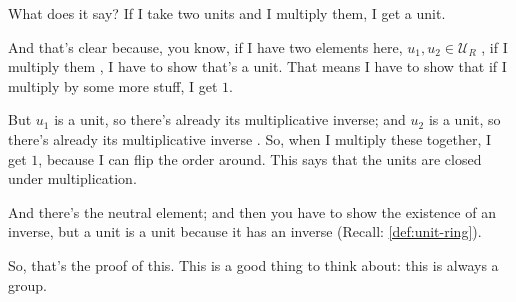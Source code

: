 \begin{speech}[00:29:52 - 00:30:47]
What does it say? If I take two units and I multiply them, I get a unit.

And that's clear because, you know, if I have two elements here, $u_1, u_2 \in \mathcal{U}_R$ , if I multiply them , I have to show that's a unit. That means I have to show that if I multiply by some more stuff, I get $1$.

But $u_1$ is a unit, so there's already its multiplicative inverse; and $u_2$ is a unit, so there's already its multiplicative inverse . So, when I multiply these together, I get $1$, because I can flip the order around. This says that the units are closed under multiplication.

And there's the neutral element; and then you have to show the existence of an inverse, but a unit is a unit because it has an inverse (Recall: \cref{def:unit-ring}).

So, that's the proof of this. This is a good thing to think about: this is always a group.
\end{speech}

